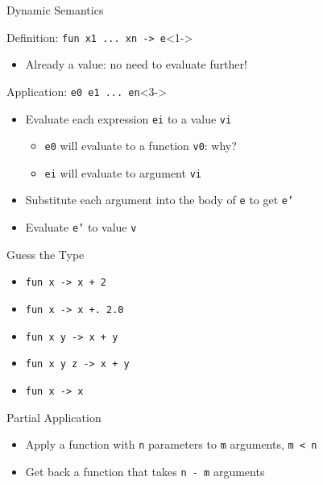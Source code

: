 \documentclass{beamer}
\newcommand{\code}[1]{\texttt{#1}}
\begin{document}
    \begin{frame}{Dynamic Semantics}
        \begin{block}{Definition: \code{fun x1 ... xn -> e}}<1->
            \begin{itemize}
                \item<2-> Already a value: no need to evaluate further!
            \end{itemize}
        \end{block}

        \begin{block}{Application: \code{e0 e1 ... en}}<3->
            \begin{itemize}
                \item Evaluate each expression \code{ei} to a value \code{vi}
                \begin{itemize}
                    \item \code{e0} will evaluate to a function \code{v0}: why?
                    \item \code{ei} will evaluate to argument \code{vi}
                \end{itemize}
                \item Substitute each argument into the body of \code{e} to get \code{e'}
                \item Evaluate \code{e'} to value \code{v}
            \end{itemize}
        \end{block} 
    \end{frame}

    \begin{frame}{Guess the Type}
        \begin{itemize} 
            \item<1-> \code{fun x -> x + 2}
            \item<2-> \code{fun x -> x +. 2.0}
            \item<3-> \code{fun x y -> x + y}
            \item<4-> \code{fun x y z -> x + y}
            \item<5-> \code{fun x -> x}
        \end{itemize}
    \end{frame}

    \begin{frame}{Partial Application}
        \begin{itemize}
            \item<1-> Apply a function with \code{n} parameters to \code{m} arguments, \code{m < n}
            \item<2-> Get back a function that takes \code{n - m} arguments
        \end{itemize}
    \end{frame}
\end{document}
